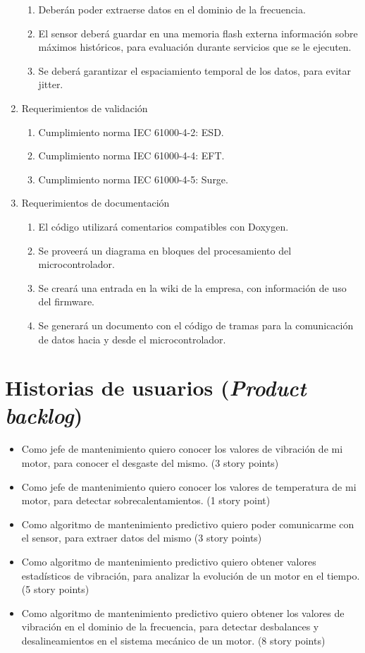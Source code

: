 \documentclass[11pt]{charter}
\begin{document}
\begin{enumerate}
\begin{enumerate}
	\item Deberán poder extraerse datos en el dominio de la frecuencia.
	\item El sensor deberá guardar en una memoria flash externa información sobre máximos históricos, para evaluación durante servicios que se le ejecuten.
	\item Se deberá garantizar el espaciamiento temporal de los datos, para evitar jitter.
	\end{enumerate}
\item Requerimientos de validación
	\begin{enumerate}
	\item Cumplimiento norma IEC 61000-4-2: ESD.
	\item Cumplimiento norma IEC 61000-4-4: EFT.
	\item Cumplimiento norma IEC 61000-4-5: Surge.
	\end{enumerate}
\item Requerimientos de documentación
	\begin{enumerate}
	\item El código utilizará comentarios compatibles con Doxygen.
	\item Se proveerá un diagrama en bloques del procesamiento del microcontrolador.
	\item Se creará una entrada en la wiki de la empresa, con información de uso del firmware.
	\item Se generará un documento con el código de tramas para la comunicación de datos hacia y desde el microcontrolador.
	\end{enumerate}
\end{enumerate}


\section{Historias de usuarios (\textit{Product backlog})}
\label{sec:backlog}

\begin{itemize}
\item Como jefe de mantenimiento quiero conocer los valores de vibración de mi motor, para conocer el desgaste del mismo. (3 story points)
\item Como jefe de mantenimiento quiero conocer los valores de temperatura de mi motor, para detectar sobrecalentamientos. (1 story point)
\item Como algoritmo de mantenimiento predictivo quiero poder comunicarme con el sensor, para extraer datos del mismo (3 story points)
\item Como algoritmo de mantenimiento predictivo quiero obtener valores estadísticos de vibración, para analizar la evolución de un motor en el tiempo. (5 story points)
\item Como algoritmo de mantenimiento predictivo quiero obtener los valores de vibración en el dominio de la frecuencia, para detectar desbalances y desalineamientos en el sistema mecánico de un motor. (8 story points)
\end{itemize}
\end{document}
